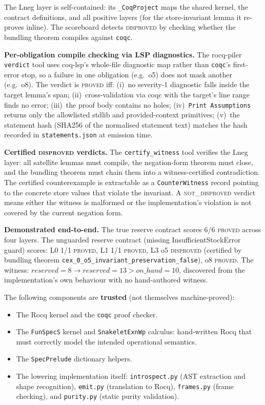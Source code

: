 \documentclass[11pt,a4paper]{article}
\begin{document}
The Lneg layer is self-contained: its \texttt{\_CoqProject} maps the
shared kernel, the contract definitions, and all positive layers (for
the store-invariant lemma it re-proves inline).  The scoreboard
detects \textsc{disproved} by checking whether the bundling theorem
compiles against \texttt{coqc}.

\textbf{Per-obligation compile checking via LSP diagnostics.}
The rocq-piler \texttt{verdict} tool uses coq-lsp's whole-file
diagnostic map rather than \texttt{coqc}'s first-error stop, so a
failure in one obligation (e.g.\ o5) does not mask another (e.g.\
o8).  The verdict is \textsc{proved} iff: (i)~no severity-1
diagnostic falls inside the target lemma's span; (ii)~cross-validation
via coqc with the target's line range finds no error; (iii)~the proof
body contains no holes; (iv)~\texttt{Print Assumptions} returns only
the allowlisted stdlib and provided-context primitives;
(v)~the statement hash (SHA256 of the normalised statement text)
matches the hash recorded in \texttt{statements.json} at emission
time.

\textbf{Certified \textsc{disproved} verdicts.}
The \texttt{certify\_witness} tool verifies the Lneg layer: all
satellite lemmas must compile, the negation-form theorem must close,
and the bundling theorem must chain them into a witness-certified
contradiction.  The certified counterexample is extractable as a
\texttt{CounterWitness} record pointing to the concrete store values
that violate the invariant.  A \textsc{not\_disproved} verdict means
either the witness is malformed or the implementation's violation is
not covered by the current negation form.

\textbf{Demonstrated end-to-end.}
The true reserve contract scores 6/6 \textsc{proved} across four
layers.  The unguarded reserve contract (missing InsufficientStockError
guard) scores: L0 1/1 \textsc{proved}, L1 1/1 \textsc{proved},
L3 o5 \textsc{disproved} (certified by bundling theorem
\texttt{cex\_0\_o5\_invariant\_preservation\_false}), o8
\textsc{proved}.  The witness: $\mathit{reserved}=8 \to
\mathit{reserved}=13 > \mathit{on\_hand}=10$, discovered from the
implementation's own behaviour with no hand-authored witness.

The following components are \textbf{trusted} (not themselves
machine-proved):

\begin{itemize}[nosep]
\item The Rocq kernel and the \texttt{coqc} proof checker.
\item The \texttt{FunSpecS} kernel and \texttt{SnakeletExnWp}
  calculus: hand-written Rocq that must correctly model the intended
  operational semantics.
\item The \texttt{SpecPrelude} dictionary helpers.
\item The lowering implementation itself: \texttt{introspect.py} (AST
  extraction and shape recognition), \texttt{emit.py} (translation to
  Rocq), \texttt{frames.py} (frame checking), and \texttt{purity.py}
  (static purity validation).
\end{itemize}
\end{document}
